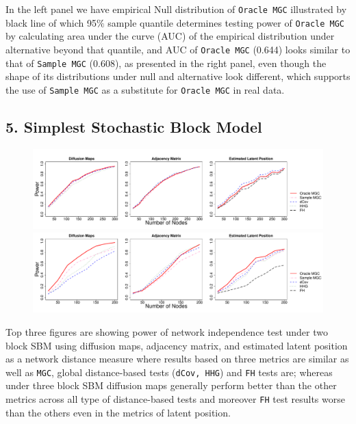 \documentclass[12pt]{article}
\begin{document}
In the left panel we have empirical Null distribution of \texttt{Oracle MGC} illustrated by black line of which 95$\%$ sample quantile determines testing power of \texttt{Oracle MGC} by calculating area under the curve (AUC) of the empirical distribution under alternative beyond that quantile, and AUC of \texttt{Oracle MGC} (0.644) looks similar to that of \texttt{Sample MGC} (0.608), as presented in the right panel, even though the shape of its distributions under null and alternative look different, which supports the use of \texttt{Sample MGC} as a substitute for \texttt{Oracle MGC} in real data.
 
\subsection*{5. Simplest Stochastic Block Model}
 
\begin{figure}[h]
	\centering
	\includegraphics[width=6in]{../Figure/twoSBM.pdf}
	\includegraphics[width=6in]{../Figure/ThreeSBM.pdf}
\end{figure}

Top three figures are showing power of network independence test  under two block SBM using diffusion maps, adjacency matrix, and estimated latent position as a network distance measure where results based on three metrics are similar as well as \texttt{MGC}, global distance-based tests (\texttt{dCov, HHG}) and \texttt{FH} tests are; whereas under three block SBM diffusion maps generally perform better than the other metrics across all type of distance-based tests and moreover \texttt{FH} test results worse than the others even in the metrics of latent position.
\end{document}
